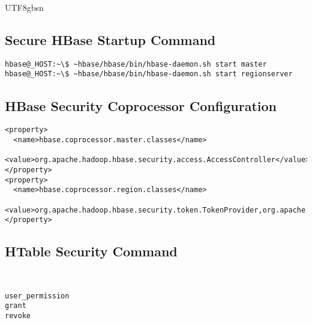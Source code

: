 \documentclass[a4paper,12pt]{article}
\begin{document}
\begin{CJK}{UTF8}{gbsn}
\subsection{Secure HBase Startup Command}
\begin{verbatim}
hbase@_HOST:~\$ ~hbase/hbase/bin/hbase-daemon.sh start master
hbase@_HOST:~\$ ~hbase/hbase/bin/hbase-daemon.sh start regionserver
\end{verbatim}

\subsection{HBase Security Coprocessor Configuration}
\begin{verbatim}
<property>
  <name>hbase.coprocessor.master.classes</name>
  <value>org.apache.hadoop.hbase.security.access.AccessController</value>
</property>
<property>
  <name>hbase.coprocessor.region.classes</name>
  <value>org.apache.hadoop.hbase.security.token.TokenProvider,org.apache.hadoop.hbase.security.access.AccessController</value>
</property>
\end{verbatim}

\subsection{HTable Security Command}　

\begin{verbatim}
user_permission
grant
revoke
\end{verbatim}


\end{CJK}
\end{document}
